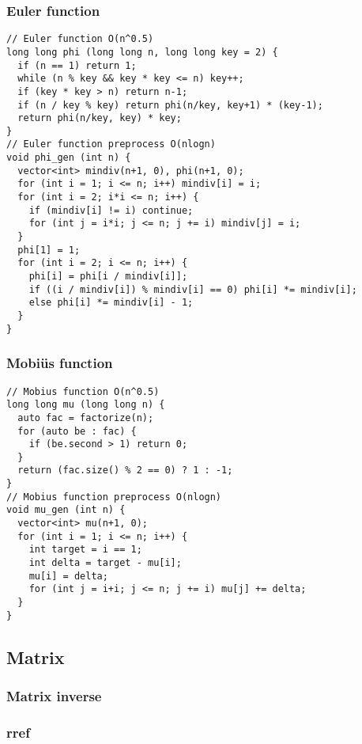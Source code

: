 \documentclass[10pt,landscape]{article}
\begin{document}
\begin{multicols}{2}
\subsubsection{Euler function}
\begin{lstlisting}
// Euler function O(n^0.5)
long long phi (long long n, long long key = 2) {
  if (n == 1) return 1;
  while (n % key && key * key <= n) key++;
  if (key * key > n) return n-1;
  if (n / key % key) return phi(n/key, key+1) * (key-1);
  return phi(n/key, key) * key;
}
// Euler function preprocess O(nlogn)
void phi_gen (int n) {
  vector<int> mindiv(n+1, 0), phi(n+1, 0);
  for (int i = 1; i <= n; i++) mindiv[i] = i;
  for (int i = 2; i*i <= n; i++) {
    if (mindiv[i] != i) continue;
    for (int j = i*i; j <= n; j += i) mindiv[j] = i;
  }
  phi[1] = 1;
  for (int i = 2; i <= n; i++) {
    phi[i] = phi[i / mindiv[i]];
    if ((i / mindiv[i]) % mindiv[i] == 0) phi[i] *= mindiv[i];
    else phi[i] *= mindiv[i] - 1;
  }
}
\end{lstlisting}
\subsubsection{Mobi\"us function}
\begin{lstlisting}
// Mobius function O(n^0.5)
long long mu (long long n) {
  auto fac = factorize(n);
  for (auto be : fac) {
    if (be.second > 1) return 0;
  }
  return (fac.size() % 2 == 0) ? 1 : -1;
}
// Mobius function preprocess O(nlogn)
void mu_gen (int n) {
  vector<int> mu(n+1, 0);
  for (int i = 1; i <= n; i++) {
    int target = i == 1;
    int delta = target - mu[i];
    mu[i] = delta;
    for (int j = i+i; j <= n; j += i) mu[j] += delta;
  }
}
\end{lstlisting}
\subsection{Matrix}
\subsubsection{Matrix inverse}
\subsubsection{rref}

\end{multicols}
\end{document}
